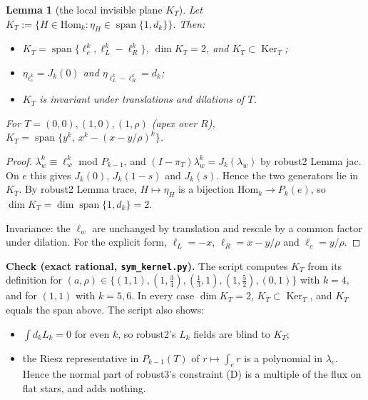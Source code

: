 \documentclass[11pt]{article}
\newtheorem{lemma}[theorem]{Lemma}
\theoremstyle{remark}
\begin{document}
\begin{lemma}[the local invisible plane $K_T$]\label{lem:KT}
Let $K_T:=\{H\in\mathrm{Hom}_k:\eta_H\in\operatorname{span}\{1,d_k\}\}$. Then:
\begin{itemize}
\item $K_T=\operatorname{span}\{\ell_c^k,\ell_L^k-\ell_R^k\}$, $\dim K_T=2$, and $K_T\subset\operatorname{Ker}_T$;
\item $\eta_{\ell_c^k}=J_k(0)$ and $\eta_{\ell_L^k-\ell_R^k}=d_k$;
\item $K_T$ is invariant under translations and dilations of $T$.
\end{itemize}
For $T=(0,0),(1,0),(1,\rho)$ (apex over $R$), $K_T=\operatorname{span}\{y^k,\ x^k-(x-y/\rho)^k\}$.
\end{lemma}
\begin{proof}
$\lambda_w^k\equiv\ell_w^k$ mod $P_{k-1}$, and $(I-\pi_T)\lambda_w^k=J_k(\lambda_w)$ by robust2 Lemma jac. On $e$ this gives
$J_k(0)$, $J_k(1-s)$ and $J_k(s)$. Hence the two generators lie in $K_T$. By robust2 Lemma trace, $H\mapsto\eta_H$ is a bijection
$\mathrm{Hom}_k\to P_k(e)$, so $\dim K_T=\dim\operatorname{span}\{1,d_k\}=2$.

Invariance: the $\ell_w$ are unchanged by translation and rescale by a common factor under dilation. For the explicit form,
$\ell_L=-x$, $\ell_R=x-y/\rho$ and $\ell_c=y/\rho$.
\end{proof}
\noindent\textbf{Check (exact rational, \texttt{sym\_kernel.py}).} The script computes $K_T$ from its definition for
$(a,\rho)\in\{(1,1),(1,\tfrac34),(\tfrac13,1),(1,\tfrac52),(0,1)\}$ with $k=4$, and for $(1,1)$ with $k=5,6$. In every case
$\dim K_T=2$, $K_T\subset\operatorname{Ker}_T$, and $K_T$ equals the span above. The script also shows:
\begin{itemize}
\item $\int d_kL_k=0$ for even $k$, so robust2's $L_k$ fields are blind to $K_T$;
\item the Riesz representative in $P_{k-1}(T)$ of $r\mapsto\int_er$ is a polynomial in $\lambda_c$. Hence the normal part of
robust3's constraint (D) is a multiple of the flux on flat stars, and adds nothing.
\end{itemize}
\end{document}
